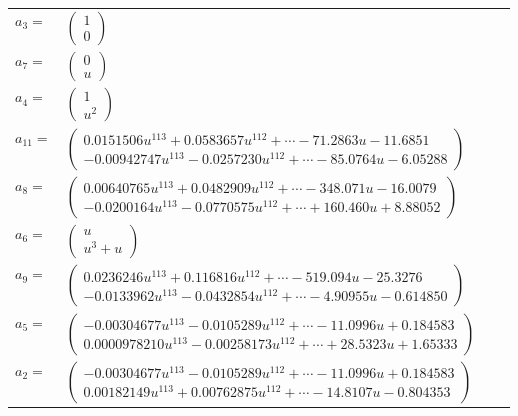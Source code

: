 \documentclass[1p]{elsarticle_modified}
\theoremstyle{definition}
\begin{document}
\begin{tabular}{m{7pt} m{180pt} m{7pt} m{180pt} }
\flushright $a_{3}=$&$\begin{pmatrix}1\\0\end{pmatrix}$ \\
\flushright $a_{7}=$&$\begin{pmatrix}0\\u\end{pmatrix}$ \\
\flushright $a_{4}=$&$\begin{pmatrix}1\\u^2\end{pmatrix}$ \\
\flushright $a_{11}=$&$\begin{pmatrix}0.0151506 u^{113}+0.0583657 u^{112}+\cdots-71.2863 u-11.6851\\-0.00942747 u^{113}-0.0257230 u^{112}+\cdots-85.0764 u-6.05288\end{pmatrix}$ \\
\flushright $a_{8}=$&$\begin{pmatrix}0.00640765 u^{113}+0.0482909 u^{112}+\cdots-348.071 u-16.0079\\-0.0200164 u^{113}-0.0770575 u^{112}+\cdots+160.460 u+8.88052\end{pmatrix}$ \\
\flushright $a_{6}=$&$\begin{pmatrix}u\\u^3+u\end{pmatrix}$ \\
\flushright $a_{9}=$&$\begin{pmatrix}0.0236246 u^{113}+0.116816 u^{112}+\cdots-519.094 u-25.3276\\-0.0133962 u^{113}-0.0432854 u^{112}+\cdots-4.90955 u-0.614850\end{pmatrix}$ \\
\flushright $a_{5}=$&$\begin{pmatrix}-0.00304677 u^{113}-0.0105289 u^{112}+\cdots-11.0996 u+0.184583\\0.0000978210 u^{113}-0.00258173 u^{112}+\cdots+28.5323 u+1.65333\end{pmatrix}$ \\
\flushright $a_{2}=$&$\begin{pmatrix}-0.00304677 u^{113}-0.0105289 u^{112}+\cdots-11.0996 u+0.184583\\0.00182149 u^{113}+0.00762875 u^{112}+\cdots-14.8107 u-0.804353\end{pmatrix}$ \\

\end{tabular}
\end{document}
